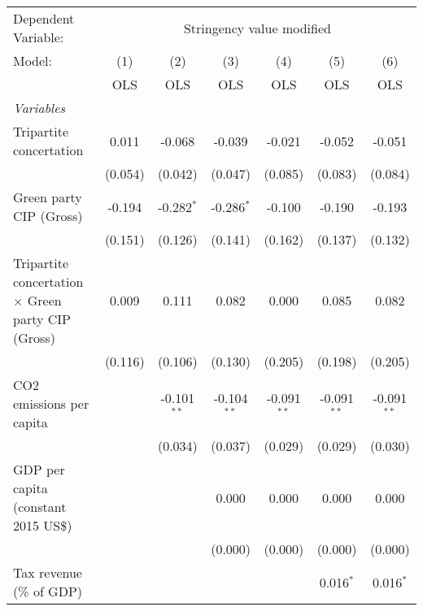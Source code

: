 
\begingroup
\centering
\begin{tabular}{lcccccc}
   \toprule
   Dependent Variable: & \multicolumn{6}{c}{Stringency value modified}\\
   Model:                                                    & (1)     & (2)           & (3)           & (4)           & (5)           & (6)\\  
                                                             &  OLS    & OLS           & OLS           & OLS           & OLS           & OLS\\  
   \midrule
   \emph{Variables}\\
   Tripartite concertation                                   & 0.011   & -0.068        & -0.039        & -0.021        & -0.052        & -0.051\\   
                                                             & (0.054) & (0.042)       & (0.047)       & (0.085)       & (0.083)       & (0.084)\\   
   Green party CIP (Gross)                                   & -0.194  & -0.282$^{*}$  & -0.286$^{*}$  & -0.100        & -0.190        & -0.193\\   
                                                             & (0.151) & (0.126)       & (0.141)       & (0.162)       & (0.137)       & (0.132)\\   
   Tripartite concertation $\times$ Green party CIP (Gross)  & 0.009   & 0.111         & 0.082         & 0.000         & 0.085         & 0.082\\   
                                                             & (0.116) & (0.106)       & (0.130)       & (0.205)       & (0.198)       & (0.205)\\   
   CO2 emissions per capita                                  &         & -0.101$^{**}$ & -0.104$^{**}$ & -0.091$^{**}$ & -0.091$^{**}$ & -0.091$^{**}$\\   
                                                             &         & (0.034)       & (0.037)       & (0.029)       & (0.029)       & (0.030)\\   
   GDP per capita (constant 2015 US\$)                       &         &               & 0.000         & 0.000         & 0.000         & 0.000\\   
                                                             &         &               & (0.000)       & (0.000)       & (0.000)       & (0.000)\\   
   Tax revenue (\% of GDP)                                   &         &               &               &               & 0.016$^{*}$   & 0.016$^{*}$\\   

\end{tabular}
